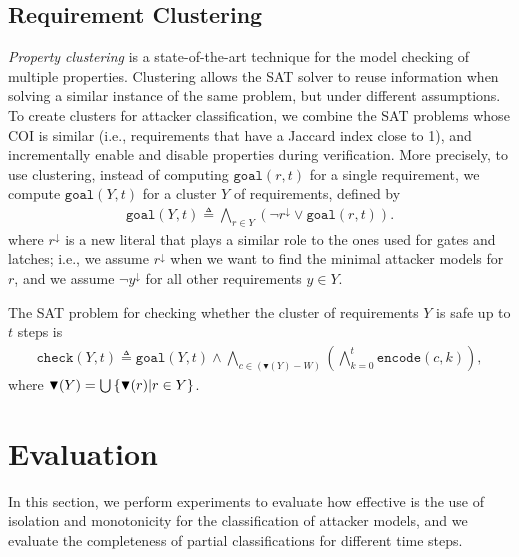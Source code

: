 {\subsection{Requirement Clustering}
\emph{Property clustering} \cite{ToSplitOrToGroup,HandbookOfSatisfiability,OptimizedModelCheckingOfMultipleProperties} is a state-of-the-art technique for the model checking of multiple properties. Clustering allows the SAT solver to reuse information when solving a similar instance of the same problem, but under different assumptions. To create clusters for attacker classification, we combine the SAT problems whose COI is similar (i.e., requirements that have a Jaccard index close to 1), and incrementally enable and disable properties during verification. More precisely, to use clustering, instead of computing $\mathtt{goal}(r,t)$ for a single requirement, we compute $\mathtt{goal}(Y,t)$ for a cluster $Y$ of requirements, defined by 
\begin{align}
\mathtt{goal}(Y,t) \triangleq \bigwedge_{r\in Y} (\lnot r^\downarrow \lor \mathtt{goal}(r,t)).
\end{align}
where $r^\downarrow$ is a new literal that plays a similar role to the ones used for gates and latches; i.e., we assume $r^\downarrow$ when we want to find the minimal attacker models for $r$, and we assume $\lnot y^\downarrow$ for all other requirements $y \in Y$. 

The SAT problem for checking whether the cluster of requirements $Y$ is safe up to $t$ steps is
\begin{align} 
\label{eq:MasterEq}
\mathtt{check}(Y,t)\triangleq\mathtt{goal}(Y,t)\land\! \bigwedge_{c\in (\blacktriangledown(Y)- W)}\left( \bigwedge_{k=0}^{t}{\mathtt{encode}(c,k)}\right),
\end{align}
where $\blacktriangledown(Y)=\bigcup \left\{\blacktriangledown(r)| r\in Y\right\}$.

\section{Evaluation}
\label{sec:evaluation}
In this section, we perform experiments to evaluate how effective is the use of isolation and monotonicity for the classification of attacker models, and we evaluate the completeness of partial classifications for different time steps. 

}
